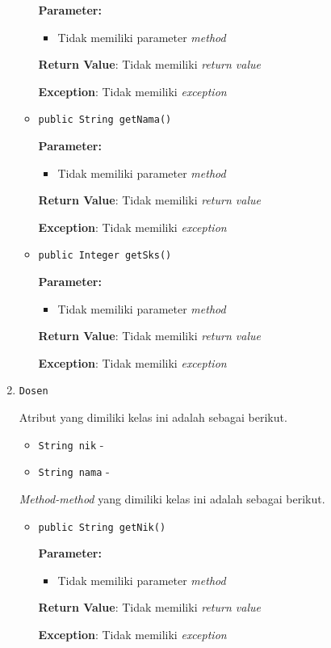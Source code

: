 \documentclass{article}
\begin{document}
\begin{enumerate}
\begin{itemize}
\textbf{Parameter:}
\begin{itemize}
\item Tidak memiliki parameter \textit{method}
\end{itemize}
\textbf{Return Value}: Tidak memiliki \textit{return value}

\textbf{Exception}: Tidak memiliki \textit{exception}

\item \texttt{public String getNama()}

\textbf{Parameter:}
\begin{itemize}
\item Tidak memiliki parameter \textit{method}
\end{itemize}
\textbf{Return Value}: Tidak memiliki \textit{return value}

\textbf{Exception}: Tidak memiliki \textit{exception}

\item \texttt{public Integer getSks()}

\textbf{Parameter:}
\begin{itemize}
\item Tidak memiliki parameter \textit{method}
\end{itemize}
\textbf{Return Value}: Tidak memiliki \textit{return value}

\textbf{Exception}: Tidak memiliki \textit{exception}

\end{itemize}
\item \texttt{Dosen}



Atribut yang dimiliki kelas ini adalah sebagai berikut.
\begin{itemize}
\item \texttt{String nik} - 
\item \texttt{String nama} - 
\end{itemize}
\textit{Method-method} yang dimiliki kelas ini adalah sebagai berikut.
\begin{itemize}
\item \texttt{public String getNik()}

\textbf{Parameter:}
\begin{itemize}
\item Tidak memiliki parameter \textit{method}
\end{itemize}
\textbf{Return Value}: Tidak memiliki \textit{return value}

\textbf{Exception}: Tidak memiliki \textit{exception}


\end{itemize}
\end{enumerate}
\end{document}
